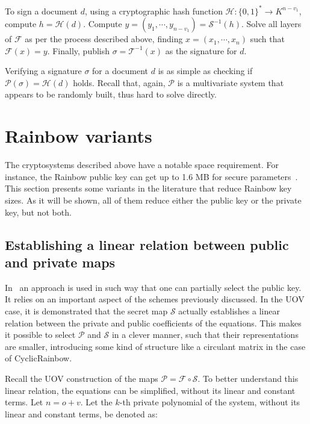 \documentclass{ufsctex/ufsctex}
\begin{document}
To sign a document $d$, using a cryptographic hash function $\mathcal{H}:
\{0,1\}^* \to K^{n-v_1}$, compute $h = \mathcal{H}(d)$. Compute $y = (y_1,
\cdots, y_{n-v_1}) = \mathcal{S}^{-1}(h)$. Solve all layers of $\mathcal{F}$ as
per the process described above, finding $x = (x_1, \cdots, x_n)$ such that
$\mathcal{F}(x) = y$. Finally, publish $\sigma = \mathcal{T}^{-1}(x)$ as the
signature for $d$.

Verifying a signature $\sigma$ for a document $d$ is as simple as checking if
$\mathcal{P}(\sigma) = \mathcal{H}(d)$ holds. Recall that, again, $\mathcal{P}$
is a multivariate system that appears to be randomly built, thus hard to solve
directly.

\section{Rainbow variants}\label{sec:rainbowvariants}

The cryptosystems described above have a notable space requirement. For
instance, the Rainbow public key can get up to 1.6 MB for secure
parameters~\cite[Table 2]{ding2017nist}. This section presents some variants in
the literature that reduce Rainbow key sizes. As it will be shown, all of them
reduce either the public key or the private key, but not both.

\subsection{Establishing a linear relation between public and private maps}
\label{sec:relation}

In~\cite{petzoldt2010cyclicrainbow} an approach is used in such way that one
can partially select the public key. It relies on an important aspect of the
schemes previously discussed. In the UOV case, it is demonstrated that the
secret map $\mathcal{S}$ actually establishes a linear relation between the
private and public coefficients of the equations. This makes it possible to
select $\mathcal{P}$ and $\mathcal{S}$ in a clever manner, such that their
representations are smaller, introducing some kind of structure like a
circulant matrix in the case of CyclicRainbow.

Recall the UOV construction of the maps $\mathcal{P} = \mathcal{F} \circ
\mathcal{S}$. To better understand this linear relation, the equations can be
simplified, without its linear and constant terms. Let $n = o + v$. Let the
$k$-th private polynomial of the system, without its linear and constant terms,
be denoted as:
\end{document}
